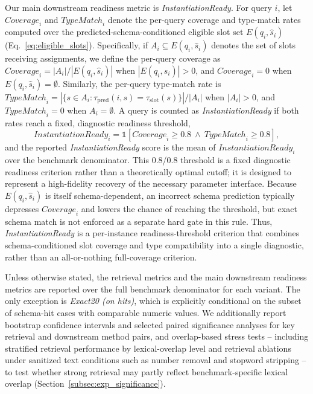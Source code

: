 \documentclass[pdflatex,sn-basic,Numbered]{sn-jnl}
\begin{document}
Our main downstream readiness metric is \textit{InstantiationReady}. For query $i$, let $\mathit{Coverage}_i$ and $\mathit{TypeMatch}_i$ denote the per-query coverage and type-match rates computed over the predicted-schema-conditioned eligible slot set $E(q_i,\hat{s}_i)$ (Eq.~\eqref{eq:eligible_slots}). Specifically, if $A_i \subseteq E(q_i,\hat{s}_i)$ denotes the set of slots receiving assignments, we define the per-query coverage as $\mathit{Coverage}_i = |A_i| / |E(q_i,\hat{s}_i)|$ when $|E(q_i,\hat{s}_i)| > 0$, and $\mathit{Coverage}_i = 0$ when $E(q_i,\hat{s}_i) = \emptyset$. Similarly, the per-query type-match rate is $\mathit{TypeMatch}_i = |\{s \in A_i : \tau_{\mathrm{pred}}(i,s) = \tau_{\mathrm{slot}}(s)\}| / |A_i|$ when $|A_i| > 0$, and $\mathit{TypeMatch}_i = 0$ when $A_i = \emptyset$. A query is counted as \textit{InstantiationReady} if both rates reach a fixed, diagnostic readiness threshold,
\begin{equation}
\mathit{InstantiationReady}_i = \mathbb{1}\!\left[\mathit{Coverage}_i \geq 0.8 \ \wedge\ \mathit{TypeMatch}_i \geq 0.8\right],
\label{eq:instantiation_ready}
\end{equation}
and the reported \textit{InstantiationReady} score is the mean of $\mathit{InstantiationReady}_i$ over the benchmark denominator. This 0.8/0.8 threshold is a fixed diagnostic readiness criterion rather than a theoretically optimal cutoff; it is designed to represent a high-fidelity recovery of the necessary parameter interface. Because $E(q_i,\hat{s}_i)$ is itself schema-dependent, an incorrect schema prediction typically depresses $\mathit{Coverage}_i$ and lowers the chance of reaching the threshold, but exact schema match is not enforced as a separate hard gate in this rule. Thus, \textit{InstantiationReady} is a per-instance readiness-threshold criterion that combines schema-conditioned slot coverage and type compatibility into a single diagnostic, rather than an all-or-nothing full-coverage criterion.

Unless otherwise stated, the retrieval metrics and the main downstream readiness metrics are reported over the full benchmark denominator for each variant. The only exception is \textit{Exact20 (on hits)}, which is explicitly conditional on the subset of schema-hit cases with comparable numeric values. We additionally report bootstrap confidence intervals and selected paired significance analyses for key retrieval and downstream method pairs, and overlap-based stress tests -- including stratified retrieval performance by lexical-overlap level and retrieval ablations under sanitized text conditions such as number removal and stopword stripping -- to test whether strong retrieval may partly reflect benchmark-specific lexical overlap (Section~\ref{subsec:exp_significance}).
\end{document}
